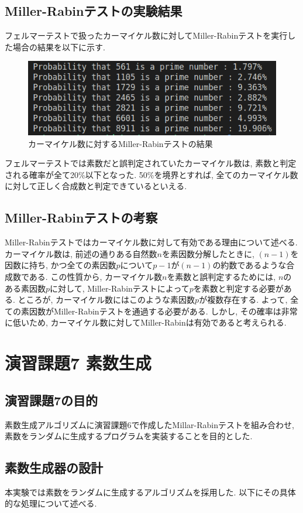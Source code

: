 \documentclass[xelatex, 11pt, a4paper, ja=standard]{bxjsarticle}
\begin{document}
\subsection{Miller-Rabinテストの実験結果}
フェルマーテストで扱ったカーマイケル数に対してMiller-Rabinテストを実行した場合の結果を以下に示す. 
\begin{figure}[htbp]
    \centering
    \includegraphics[height=0.15\textwidth,keepaspectratio]{./image/carmichael_miller-rabin.png}
    \caption{カーマイケル数に対するMiller-Rabinテストの結果}
    \label{fig:screenshot}
\end{figure}

フェルマーテストでは素数だと誤判定されていたカーマイケル数は, 素数と判定される確率が全て20\%以下となった. 
50\%を境界とすれば, 全てのカーマイケル数に対して正しく合成数と判定できているといえる. 

\subsection{Miller-Rabinテストの考察}
Miller-Rabinテストではカーマイケル数に対して有効である理由について述べる. 
カーマイケル数は, 前述の通りある自然数$n$を素因数分解したときに, $(n-1)$を因数に持ち, 
かつ全ての素因数$p$について$p-1$が$(n-1)$の約数であるような合成数である. 
この性質から, カーマイケル数$n$を素数と誤判定するためには, $n$のある素因数$p$に対して, 
Miller-Rabinテストによって$p$を素数と判定する必要がある. 
ところが, カーマイケル数にはこのような素因数$p$が複数存在する. 
よって, 全ての素因数がMiller-Rabinテストを通過する必要がある. 
しかし, その確率は非常に低いため, カーマイケル数に対してMiller-Rabinは有効であると考えられる. 

\section{演習課題7 素数生成}
\subsection{演習課題7の目的}
素数生成アルゴリズムに演習課題6で作成したMillar-Rabinテストを組み合わせ, 素数をランダムに生成するプログラムを実装することを目的とした. 

\subsection{素数生成器の設計}
本実験では素数をランダムに生成するアルゴリズムを採用した. 
以下にその具体的な処理について述べる. 
\end{document}
